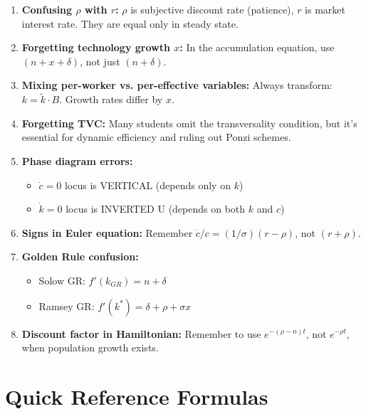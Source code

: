 \documentclass[a4paper,11pt]{article}
\newcommand{\ktilde}{\tilde{k}}
\begin{document}
\begin{enumerate}
    \item \textbf{Confusing $\rho$ with $r$:} $\rho$ is subjective discount rate (patience), $r$ is market interest rate. They are equal only in steady state.
    
    \item \textbf{Forgetting technology growth $x$:} In the accumulation equation, use $(n + x + \delta)$, not just $(n + \delta)$.
    
    \item \textbf{Mixing per-worker vs. per-effective variables:} Always transform: $k = \ktilde \cdot B$. Growth rates differ by $x$.
    
    \item \textbf{Forgetting TVC:} Many students omit the transversality condition, but it's essential for dynamic efficiency and ruling out Ponzi schemes.
    
    \item \textbf{Phase diagram errors:}
        \begin{itemize}
            \item $\dot{c} = 0$ locus is VERTICAL (depends only on $k$)
            \item $\dot{k} = 0$ locus is INVERTED U (depends on both $k$ and $c$)
        \end{itemize}
    
    \item \textbf{Signs in Euler equation:} Remember $\dot{c}/c = (1/\sigma)(r - \rho)$, not $(r + \rho)$.
    
    \item \textbf{Golden Rule confusion:}
        \begin{itemize}
            \item Solow GR: $f'(k_{GR}) = n + \delta$
            \item Ramsey GR: $f'(k^*) = \delta + \rho + \sigma x$
        \end{itemize}
    
    \item \textbf{Discount factor in Hamiltonian:} Remember to use $e^{-(\rho-n)t}$, not $e^{-\rho t}$, when population growth exists.
\end{enumerate}

\section{Quick Reference Formulas}
\end{document}
